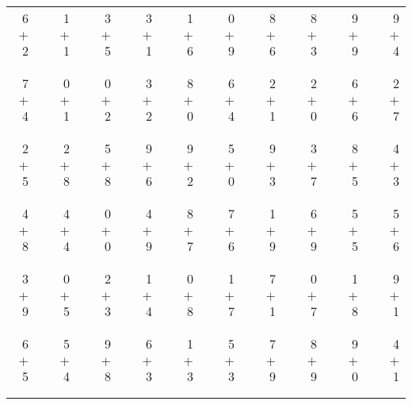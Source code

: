 \documentclass[12pt, letterpaper]{article}
\begin{document}
\begin{tabular}{rrrrrrrrrrrrrrrrrrr}
6 & & 1 & & 3 & & 3 & & 1 & & 0 & & 8 & & 8 & & 9 & & 9\\
$+$ 2 & & $+$ 1 & & $+$ 5 & & $+$ 1 & & $+$ 6 & & $+$ 9 & & $+$ 6 & & $+$ 3 & & $+$ 9 & & $+$ 4\\
\cline{1-1} \cline{3-3} \cline{5-5} \cline{7-7} \cline{9-9} \cline{11-11} \cline{13-13} \cline{15-15} \cline{17-17} \cline{19-19} \\ \\
7 & & 0 & & 0 & & 3 & & 8 & & 6 & & 2 & & 2 & & 6 & & 2\\
$+$ 4 & & $+$ 1 & & $+$ 2 & & $+$ 2 & & $+$ 0 & & $+$ 4 & & $+$ 1 & & $+$ 0 & & $+$ 6 & & $+$ 7\\
\cline{1-1} \cline{3-3} \cline{5-5} \cline{7-7} \cline{9-9} \cline{11-11} \cline{13-13} \cline{15-15} \cline{17-17} \cline{19-19} \\ \\
2 & & 2 & & 5 & & 9 & & 9 & & 5 & & 9 & & 3 & & 8 & & 4\\
$+$ 5 & & $+$ 8 & & $+$ 8 & & $+$ 6 & & $+$ 2 & & $+$ 0 & & $+$ 3 & & $+$ 7 & & $+$ 5 & & $+$ 3\\
\cline{1-1} \cline{3-3} \cline{5-5} \cline{7-7} \cline{9-9} \cline{11-11} \cline{13-13} \cline{15-15} \cline{17-17} \cline{19-19} \\ \\
4 & & 4 & & 0 & & 4 & & 8 & & 7 & & 1 & & 6 & & 5 & & 5\\
$+$ 8 & & $+$ 4 & & $+$ 0 & & $+$ 9 & & $+$ 7 & & $+$ 6 & & $+$ 9 & & $+$ 9 & & $+$ 5 & & $+$ 6\\
\cline{1-1} \cline{3-3} \cline{5-5} \cline{7-7} \cline{9-9} \cline{11-11} \cline{13-13} \cline{15-15} \cline{17-17} \cline{19-19} \\ \\
3 & & 0 & & 2 & & 1 & & 0 & & 1 & & 7 & & 0 & & 1 & & 9\\
$+$ 9 & & $+$ 5 & & $+$ 3 & & $+$ 4 & & $+$ 8 & & $+$ 7 & & $+$ 1 & & $+$ 7 & & $+$ 8 & & $+$ 1\\
\cline{1-1} \cline{3-3} \cline{5-5} \cline{7-7} \cline{9-9} \cline{11-11} \cline{13-13} \cline{15-15} \cline{17-17} \cline{19-19} \\ \\
6 & & 5 & & 9 & & 6 & & 1 & & 5 & & 7 & & 8 & & 9 & & 4\\
$+$ 5 & & $+$ 4 & & $+$ 8 & & $+$ 3 & & $+$ 3 & & $+$ 3 & & $+$ 9 & & $+$ 9 & & $+$ 0 & & $+$ 1\\
\cline{1-1} \cline{3-3} \cline{5-5} \cline{7-7} \cline{9-9} \cline{11-11} \cline{13-13} \cline{15-15} \cline{17-17} \cline{19-19} \\ \\

\end{tabular}
\end{document}
